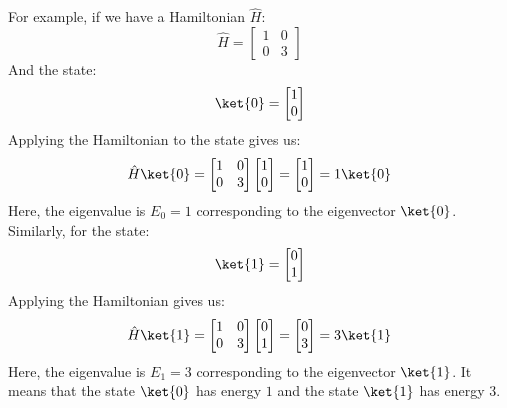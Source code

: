 \highspace
For example, if we have a Hamiltonian $\hat{H}$:
\begin{equation*}
    \hat{H} = \begin{bmatrix}
        1 & 0 \\
        0 & 3
    \end{bmatrix}
\end{equation*}
And the state:
\begin{equation*}
    \ket{0} = \begin{bmatrix}
        1 \\
        0
    \end{bmatrix}
\end{equation*}
Applying the Hamiltonian to the state gives us:
\begin{equation*}
    \hat{H} \ket{0} = \begin{bmatrix}
        1 & 0 \\
        0 & 3
    \end{bmatrix} \begin{bmatrix}
        1 \\
        0
    \end{bmatrix} = \begin{bmatrix}
        1 \\
        0
    \end{bmatrix} = 1 \ket{0}
\end{equation*}
Here, the eigenvalue is $E_0 = 1$ corresponding to the eigenvector $\ket{0}$. Similarly, for the state:
\begin{equation*}
    \ket{1} = \begin{bmatrix}
        0 \\
        1
    \end{bmatrix}
\end{equation*}
Applying the Hamiltonian gives us:
\begin{equation*}
    \hat{H} \ket{1} = \begin{bmatrix}
        1 & 0 \\
        0 & 3
    \end{bmatrix} \begin{bmatrix}
        0 \\
        1
    \end{bmatrix} = \begin{bmatrix}
        0 \\
        3
    \end{bmatrix} = 3 \ket{1}
\end{equation*}
Here, the eigenvalue is $E_1 = 3$ corresponding to the eigenvector $\ket{1}$. It means that the state $\ket{0}$ has energy $1$ and the state $\ket{1}$ has energy $3$.

